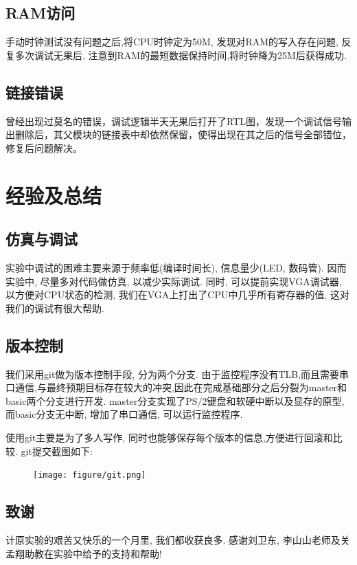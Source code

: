 \subsection{RAM访问}
手动时钟测试没有问题之后,将CPU时钟定为50M,
发现对RAM的写入存在问题,
反复多次调试无果后, 注意到RAM的最短数据保持时间,将时钟降为25M后获得成功.
\subsection{链接错误}
曾经出现过莫名的错误，调试逻辑半天无果后打开了RTL图，发现一个调试信号输出删除后，其父模块的链接表中却依然保留，使得出现在其之后的信号全部错位，修复后问题解决。

\section{经验及总结}
\subsection{仿真与调试}
  实验中调试的困难主要来源于频率低(编译时间长), 信息量少(LED, 数码管).
  因而实验中, 尽量多对代码做仿真, 以减少实际调试.
  同时, 可以提前实现VGA调试器, 以方便对CPU状态的检测, 我们在VGA上打出了CPU中几乎所有寄存器的值,
  这对我们的调试有很大帮助.

\subsection{版本控制}
我们采用git做为版本控制手段, 分为两个分支.
由于监控程序没有TLB,而且需要串口通信,与最终预期目标存在较大的冲突,因此在完成基础部分之后分裂为master和basic两个分支进行开发.
master分支实现了PS/2键盘和软硬中断以及显存的原型, 而basic分支无中断, 增加了串口通信, 可以运行监控程序.

使用git主要是为了多人写作, 同时也能够保存每个版本的信息,方便进行回滚和比较. git提交截图如下:
\begin{figure}[H]
  \centering
  \texttt{[image: figure/git.png]}
\end{figure}


\subsection{致谢}
计原实验的艰苦又快乐的一个月里, 我们都收获良多.
感谢刘卫东, 李山山老师及关孟翔助教在实验中给予的支持和帮助!
